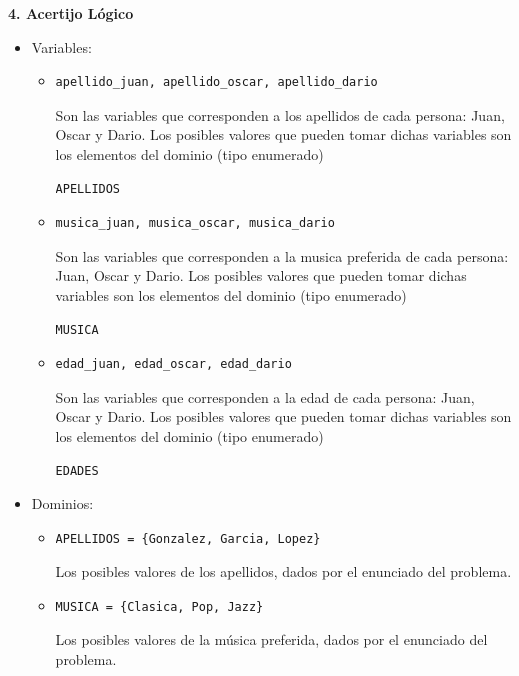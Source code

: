 \documentclass[12pt]{article}
\begin{document}
\newpage

\begin{flushleft}
\textbf{4. Acertijo Lógico}
\end{flushleft}

\begin{itemize}
\item Variables:
\begin{itemize}
\item \begin{verbatim}
apellido_juan, apellido_oscar, apellido_dario
\end{verbatim}
Son las variables que corresponden a los apellidos de cada persona: Juan, Oscar y Dario. Los posibles valores que pueden tomar dichas variables son los elementos del dominio (tipo enumerado) \begin{verbatim}
APELLIDOS
\end{verbatim}
\item \begin{verbatim}
musica_juan, musica_oscar, musica_dario
\end{verbatim}
Son las variables que corresponden a la musica preferida de cada persona: Juan, Oscar y Dario. Los posibles valores que pueden tomar dichas variables son los elementos del dominio (tipo enumerado) \begin{verbatim}
MUSICA
\end{verbatim}
\item \begin{verbatim}
edad_juan, edad_oscar, edad_dario
\end{verbatim}
Son las variables que corresponden a la edad de cada persona: Juan, Oscar y Dario. Los posibles valores que pueden tomar dichas variables son los elementos del dominio (tipo enumerado) \begin{verbatim}
EDADES
\end{verbatim}
\end{itemize}
\item Dominios:
\begin{itemize}
\item \begin{verbatim}
APELLIDOS = {Gonzalez, Garcia, Lopez}
\end{verbatim}
Los posibles valores de los apellidos, dados por el enunciado del problema.
\item \begin{verbatim}
MUSICA = {Clasica, Pop, Jazz}
\end{verbatim}
Los posibles valores de la música preferida, dados por el enunciado del problema.

\end{itemize}
\end{itemize}
\end{document}
